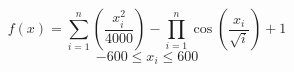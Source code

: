 \begin{equation}
f(x)=\sum_{i=1}^{n} \left(\frac{x_{i}^{2}}{4000}\right)-\prod_{i=1}^{n} \cos \left(\frac{x_{i}}{\sqrt{i}}\right)+1 
\label{griewank_formula}
\end{equation}
\begin{equation*}-600 \leq x_{i} \leq 600\end{equation*}